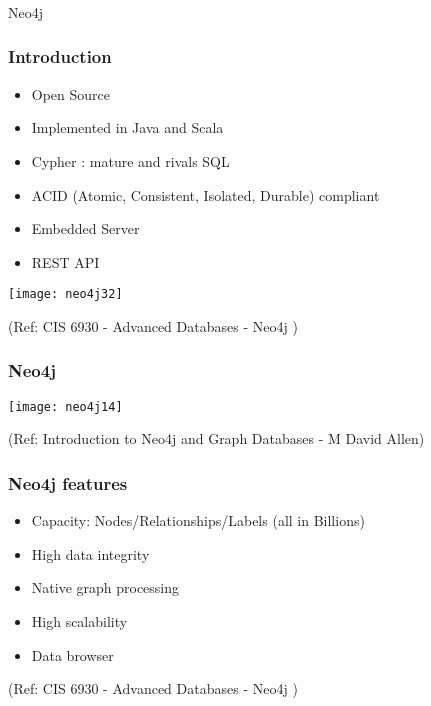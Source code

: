 \begin{frame}[fragile]\frametitle{}
\begin{center}
{\Large Neo4j}
\end{center}
\end{frame}


\begin{frame}\frametitle{Introduction}

\begin{itemize}
\item Open Source
\item Implemented in Java and Scala
\item Cypher : mature and rivals SQL
\item ACID (Atomic, Consistent, Isolated, Durable) compliant
\item Embedded Server
\item REST API
\end{itemize}


\begin{center}
\texttt{[image: neo4j32]}
\end{center}	

{\tiny (Ref: CIS 6930 - Advanced Databases - Neo4j )}
\end{frame}


\begin{frame}[fragile]\frametitle{Neo4j}

\begin{center}
\texttt{[image: neo4j14]}
\end{center}	  

{\tiny (Ref: Introduction to Neo4j and Graph Databases
 - M David Allen)}

\end{frame}

\begin{frame}\frametitle{Neo4j features}

\begin{itemize}
\item Capacity: Nodes/Relationships/Labels (all in Billions)
\item High data integrity
\item Native graph processing
\item High scalability
\item Data browser
\end{itemize}

{\tiny (Ref: CIS 6930 - Advanced Databases - Neo4j )}
\end{frame}


